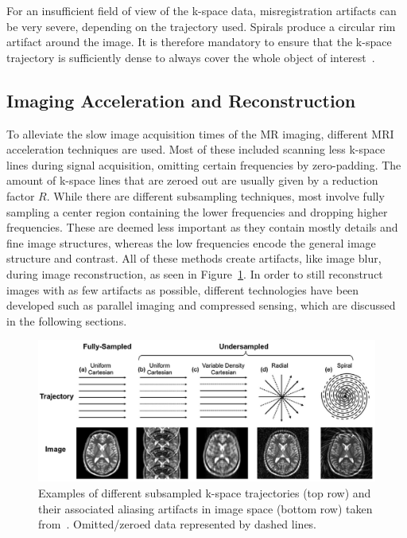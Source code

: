 For an insufficient field of view of the k-space data, misregistration artifacts can be very severe, depending on the trajectory used. Spirals produce a circular rim artifact around the image. It is therefore mandatory to ensure that the k-space trajectory is sufficiently dense to always cover the whole object of interest~\cite{SamplingStrategies}. 

\subsection{Imaging Acceleration and Reconstruction} \label{SubSec:ImagingAccelerationReconstruction}
To alleviate the slow image acquisition times of the MR imaging, different MRI acceleration techniques are used. Most of these included scanning less k-space lines during signal acquisition, omitting certain frequencies by zero-padding.
The amount of k-space lines that are zeroed out are usually given by a reduction factor $R$. While there are different subsampling techniques, most involve fully sampling a center region containing the lower frequencies and dropping higher frequencies. These are deemed less important as they contain mostly details and fine image structures, whereas the low frequencies encode the general image structure and contrast. All of these methods create artifacts, like image blur, during image reconstruction, as seen in Figure~\ref{fig:ExamplesSubsampling}. In order to still reconstruct images with as few artifacts as possible, different technologies have been developed such as parallel imaging and compressed sensing, which are discussed in the following sections.

\begin{figure}[h] %
	\centering
	\graphicspath{{images/}{\main/images/}}
	\includegraphics[width=\linewidth]{ExamplesSubsampling.png} 
	\caption{Examples of different subsampled k-space trajectories (top row) and their associated aliasing artifacts in image space (bottom row) taken from~\cite{AdvancesPI}. Omitted/zeroed data represented by dashed lines.}
	\label{fig:ExamplesSubsampling}
\end{figure}

